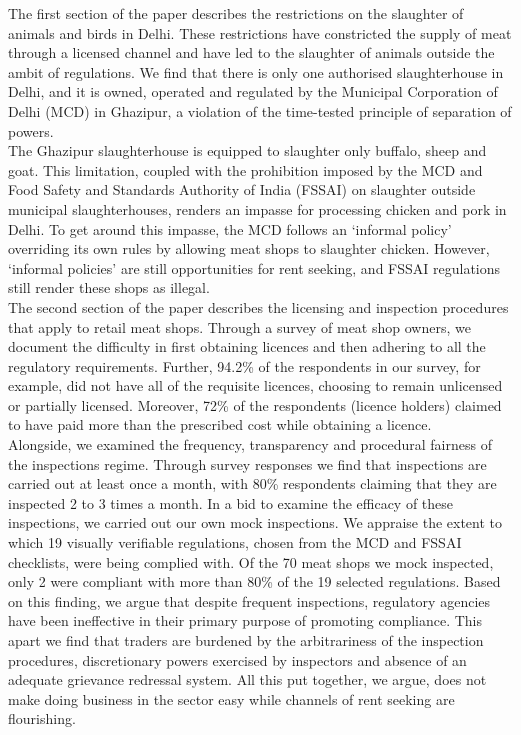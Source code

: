 \documentclass[a4paper, 12pt]{article}
\begin{document}
The first section of the paper describes the restrictions on the slaughter of animals and birds in Delhi. These restrictions have constricted the supply of meat through a licensed channel and have led to the slaughter of animals outside the ambit of regulations. We find that there is only one authorised slaughterhouse in Delhi, and it is owned, operated and regulated by the Municipal Corporation of Delhi (MCD) in Ghazipur, a violation of the time-tested principle of separation of powers. \\

The Ghazipur slaughterhouse is equipped to slaughter only buffalo, sheep and goat. This limitation, coupled with the prohibition imposed by the MCD and Food Safety and Standards Authority of India (FSSAI) on slaughter outside municipal slaughterhouses, renders an impasse for processing chicken and pork in Delhi. To get around this impasse, the MCD follows an ‘informal policy’ overriding its own rules by allowing meat shops to slaughter chicken. However, ‘informal policies’ are still opportunities for rent seeking, and FSSAI regulations still render these shops as illegal. \\

The second section of the paper describes the licensing and inspection procedures that apply to retail meat shops. Through a survey of meat shop owners, we document the difficulty in first obtaining licences and then adhering to all the regulatory requirements. Further, 94.2\% of the respondents in our survey, for example, did not have all of the requisite licences, choosing to remain unlicensed or partially licensed. Moreover, 72\% of the respondents (licence holders) claimed to have paid more than the prescribed cost while obtaining a licence. \\

Alongside, we examined the frequency, transparency and procedural fairness of the inspections regime. Through survey responses we find that inspections are carried out at least once a month, with 80\% respondents claiming that they are inspected 2 to 3 times a month. In a bid to examine the efficacy of these inspections, we carried out our own mock inspections. We appraise the extent to which 19 visually verifiable regulations, chosen from the MCD and FSSAI checklists, were being complied with. Of the 70 meat shops we mock inspected, only 2 were compliant with more than 80\% of the 19 selected regulations. Based on this finding, we argue that despite frequent inspections, regulatory agencies have been ineffective in their primary purpose of promoting compliance. This apart we find that traders are burdened by the arbitrariness of the inspection procedures, discretionary powers exercised by inspectors and absence of an adequate grievance redressal system. All this put together, we argue, does not make doing business in the sector easy while channels of rent seeking are flourishing. \\
\end{document}
